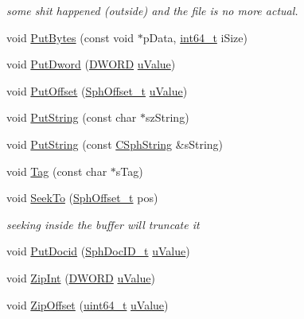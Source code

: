 \begin{DoxyCompactItemize}
\begin{DoxyCompactList}\small\item\em some shit happened (outside) and the file is no more actual. \end{DoxyCompactList}\item 
void \hyperlink{classCSphWriter_ab7f1b920a37484cad2b95af53e488397}{Put\-Bytes} (const void $\ast$p\-Data, \hyperlink{sphinxstd_8h_a996e72f71b11a5bb8b3b7b6936b1516d}{int64\-\_\-t} i\-Size)
\item 
void \hyperlink{classCSphWriter_a81007e41a63aabc11ce98aefa9061f15}{Put\-Dword} (\hyperlink{sphinxstd_8h_a798af1e30bc65f319c1a246cecf59e39}{D\-W\-O\-R\-D} \hyperlink{sphinxsort_8cpp_a7906295a5b0753053dbc737117036d06}{u\-Value})
\item 
void \hyperlink{classCSphWriter_ab59907f291aaf1b85d175a0b918ccd34}{Put\-Offset} (\hyperlink{sphinx_8h_a0fb3b64afebef33c61367714754eaa90}{Sph\-Offset\-\_\-t} \hyperlink{sphinxsort_8cpp_a7906295a5b0753053dbc737117036d06}{u\-Value})
\item 
void \hyperlink{classCSphWriter_a1206f841c63fda947bb19ac992b23a1e}{Put\-String} (const char $\ast$sz\-String)
\item 
void \hyperlink{classCSphWriter_a57d2e6046262b9659efe34837dd3b40c}{Put\-String} (const \hyperlink{structCSphString}{C\-Sph\-String} \&s\-String)
\item 
void \hyperlink{classCSphWriter_aec40f95e1538a56361112fdd9c4b137e}{Tag} (const char $\ast$s\-Tag)
\item 
void \hyperlink{classCSphWriter_a3f8c7f7118177127a0f06ece4f7bc4c3}{Seek\-To} (\hyperlink{sphinx_8h_a0fb3b64afebef33c61367714754eaa90}{Sph\-Offset\-\_\-t} pos)
\begin{DoxyCompactList}\small\item\em seeking inside the buffer will truncate it \end{DoxyCompactList}\item 
void \hyperlink{classCSphWriter_a9cd649cf598cfd4caa2475d582989533}{Put\-Docid} (\hyperlink{sphinx_8h_a3176771631c12a9e4897272003e6b447}{Sph\-Doc\-I\-D\-\_\-t} \hyperlink{sphinxsort_8cpp_a7906295a5b0753053dbc737117036d06}{u\-Value})
\item 
void \hyperlink{classCSphWriter_ad6f9af9612d37ea9fcbdf0db36370968}{Zip\-Int} (\hyperlink{sphinxstd_8h_a798af1e30bc65f319c1a246cecf59e39}{D\-W\-O\-R\-D} \hyperlink{sphinxsort_8cpp_a7906295a5b0753053dbc737117036d06}{u\-Value})
\item 
void \hyperlink{classCSphWriter_a87fde3002e70de564a60f97609d8fa6b}{Zip\-Offset} (\hyperlink{sphinxstd_8h_aaa5d1cd013383c889537491c3cfd9aad}{uint64\-\_\-t} \hyperlink{sphinxsort_8cpp_a7906295a5b0753053dbc737117036d06}{u\-Value})

\end{DoxyCompactItemize}
